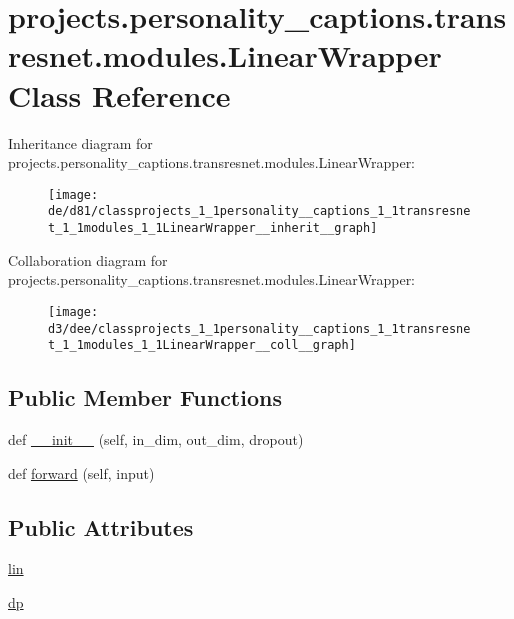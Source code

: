 \hypertarget{classprojects_1_1personality__captions_1_1transresnet_1_1modules_1_1LinearWrapper}{}\section{projects.\+personality\+\_\+captions.\+transresnet.\+modules.\+Linear\+Wrapper Class Reference}
\label{classprojects_1_1personality__captions_1_1transresnet_1_1modules_1_1LinearWrapper}


Inheritance diagram for projects.\+personality\+\_\+captions.\+transresnet.\+modules.\+Linear\+Wrapper\+:\nopagebreak
\begin{figure}[H]
\begin{center}
\leavevmode
\texttt{[image: de/d81/classprojects\_1\_1personality\_\_captions\_1\_1transresnet\_1\_1modules\_1\_1LinearWrapper\_\_inherit\_\_graph]}
\end{center}
\end{figure}


Collaboration diagram for projects.\+personality\+\_\+captions.\+transresnet.\+modules.\+Linear\+Wrapper\+:\nopagebreak
\begin{figure}[H]
\begin{center}
\leavevmode
\texttt{[image: d3/dee/classprojects\_1\_1personality\_\_captions\_1\_1transresnet\_1\_1modules\_1\_1LinearWrapper\_\_coll\_\_graph]}
\end{center}
\end{figure}
\subsection*{Public Member Functions}
\begin{DoxyCompactItemize}
\item 
def \hyperlink{classprojects_1_1personality__captions_1_1transresnet_1_1modules_1_1LinearWrapper_a2e10c4bb01e3df60871dc6b0ac5c88a7}{\+\_\+\+\_\+init\+\_\+\+\_\+} (self, in\+\_\+dim, out\+\_\+dim, dropout)
\item 
def \hyperlink{classprojects_1_1personality__captions_1_1transresnet_1_1modules_1_1LinearWrapper_a01b6a807a29f852bbd6109ce1f105f6b}{forward} (self, input)
\end{DoxyCompactItemize}
\subsection*{Public Attributes}
\begin{DoxyCompactItemize}
\item 
\hyperlink{classprojects_1_1personality__captions_1_1transresnet_1_1modules_1_1LinearWrapper_a8411866655bcc0a2d1f81872d690f0bd}{lin}
\item 
\hyperlink{classprojects_1_1personality__captions_1_1transresnet_1_1modules_1_1LinearWrapper_a82d3bfca084c402ccc7d94e8db852610}{dp}
\end{DoxyCompactItemize}


